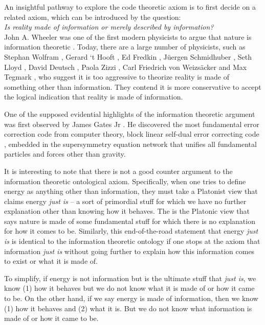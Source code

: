 \documentclass[submission,copyright,creativecommons]{eptcs}
\begin{document}
An insightful pathway to explore the code theoretic axiom is to first decide on a related axiom, which can be introduced by the question: \\

\textit{Is reality made of information or merely described by information?} \\

John A. Wheeler was one of the first modern physicists to argue that nature is information theoretic \cite{wheeler1990information}. Today, there are a large number of physicists, such as Stephan Wolfram \cite{wolfram2002new}, Gerard ‘t Hooft \cite{hooft2003can}, Ed Fredkin \cite{fredkin1990digital}, Jüergen Schmidhuber \cite{schmidhuber1997computer}, Seth Lloyd \cite{lloyd1996universal}, David Deutsch \cite{deutsch1998fabric}, Paola Zizzi \cite{zizzi2000emergent},  Carl Friedrich von Weizsäcker \cite{weizsacker1948geschichte} and Max Tegmark \cite{tegmark1998theory}, who suggest it is too aggressive to theorize reality is made of something other than information. They contend it is more conservative to accept the logical indication that reality is made of information.

One of the supposed evidential highlights of the information theoretic argument was first observed by James Gates Jr . He discovered the most fundamental error correction code from computer theory, block linear self-dual error correcting code \cite{doran2008relating}, embedded in the supersymmetry equation network that unifies all fundamental particles and forces other than gravity\cite{nilles1984supersymmetry}. 

It is interesting to note that there is not a good counter argument to the information theoretic ontological axiom. Specifically, when one tries to define energy as anything other than information, they must take a Platonist view that claims energy \textit{just is} --
a sort of primordial stuff for which we have no further explanation other than knowing how it behaves. The is the Platonic view that says nature is made of some fundamental stuff for which there is no explanation for how it comes to be. Similarly, this end-of-the-road statement that energy \textit{just is} is identical to the information theoretic ontology if one stops at the axiom that information \textit{just is} without going further to explain how this information comes to exist or what it is made of. 

To simplify, if energy is not information but is the ultimate stuff that \textit{just is}, we know (1) how it behaves but we do not know what it is made of or how it came to be. On the other hand, if we say energy is made of information, then we know (1) how it behaves and (2) what it is. But we do not know what information is made of or how it came to be. \\
\end{document}
